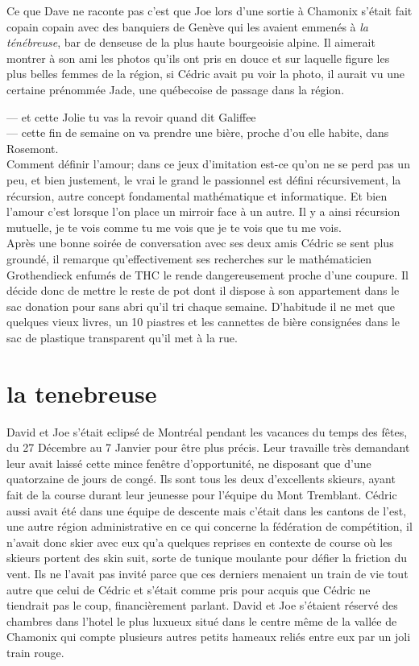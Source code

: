 \documentclass{article}
\begin{document}
Ce que Dave ne raconte pas c'est que Joe lors d'une sortie à Chamonix s'était
fait copain copain avec des banquiers de Genève qui les avaient emmenés à
\textit{la ténébreuse}, bar de denseuse de la plus haute bourgeoisie alpine. Il
aimerait montrer à son ami les photos qu'ils ont pris en douce et sur laquelle
figure les plus belles femmes de la région, si Cédric avait pu voir la photo, il aurait
vu une certaine prénommée Jade, une québecoise de passage dans la région.

--- et cette Jolie tu vas la revoir quand dit Galiffee\\
--- cette fin de semaine on va prendre une bière, proche d'ou elle habite, dans Rosemont.\\

Comment définir l'amour; dans ce jeux d'imitation est-ce qu'on ne se perd pas un
peu, et bien justement, le vrai le grand le passionnel est défini récursivement,
la récursion, autre concept fondamental mathématique et informatique. Et bien
l'amour c'est lorsque l'on place un mirroir face à un autre. Il y a ainsi
récursion mutuelle, je te vois comme tu me vois que je te vois que tu me vois.\\

Après une bonne soirée de conversation avec ses deux amis Cédric se sent plus
groundé, il remarque qu'effectivement ses recherches sur le mathématicien
Grothendieck enfumés de THC le rende dangereusement proche d'une coupure. Il
décide donc de mettre le reste de pot dont il dispose à son appartement dans le
sac donation pour sans abri qu'il tri chaque semaine. D'habitude il ne met que
quelques vieux livres, un 10 piastres et les cannettes de bière consignées dans
le sac de plastique transparent qu'il met à la rue.

\clearpage

\section{la tenebreuse}


David et Joe s'était eclipsé de Montréal pendant les vacances du temps des
fêtes, du 27 Décembre au 7 Janvier pour être plus précis. Leur travaille très
demandant leur avait laissé cette mince fenêtre d'opportunité, ne disposant que
d'une quatorzaine de jours de congé. Ils sont tous les deux d'excellents
skieurs, ayant fait de la course durant leur jeunesse pour l'équipe du Mont
Tremblant. Cédric aussi avait été dans une équipe de descente mais c'était dans
les cantons de l'est, une autre région administrative en ce qui concerne la
fédération de compétition, il n'avait donc skier avec eux qu'a quelques reprises
en contexte de course où les skieurs portent des skin suit, sorte de tunique
moulante pour défier la friction du vent. Ils ne l'avait pas invité parce que
ces derniers menaient un train de vie tout autre que celui de Cédric et s'était
comme pris pour acquis que Cédric ne tiendrait pas le coup, financièrement
parlant. David et Joe s'étaient réservé des chambres dans l'hotel le plus
luxueux situé dans le centre même de la vallée de Chamonix qui compte plusieurs
autres petits hameaux reliés entre eux par un joli train rouge.\\
\end{document}
